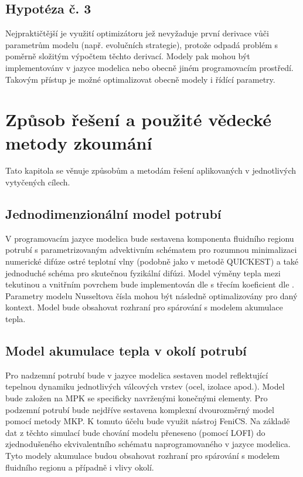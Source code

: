 \section*{Hypotéza č. 3}
Nejpraktičtější je využití optimizátoru jež nevyžaduje první derivace vůči
parametrům modelu (např. evolučních strategie), protože odpadá problém s
poměrně složitým výpočtem těchto derivací. Modely pak mohou být implementovánv
v jazyce modelica nebo obecně jiném programovacím prostředí. Takovým přístup je
možné optimalizovat obecně modely i řídící parametry.
\chapter{Způsob řešení a použité vědecké metody zkoumání}
Tato kapitola se věnuje způsobům a metodám řešení aplikovaných v jednotlivých
vytyčených cílech.
\section{Jednodimenzionální model potrubí}
\label{sec:1Dpipe}
V programovacím jazyce modelica bude sestavena komponenta fluidního regionu
potrubí s parametrizovaným advektivním schématem pro rozumnou minimalizaci
numerické difúze ostré teplotní vlny (podobně jako v metodě QUICKEST) a také
jednoduché schéma pro skutečnou fyzikální difúzi. Model výměny tepla mezi
tekutinou a vnitřním povrchem bude implementován dle \cite{Abraham2009} s
třecím koeficient dle \cite{Churchill1977}. Parametry modelu Nusseltova čísla
mohou být následně optimalizovány pro daný kontext. Model bude obsahovat
rozhraní pro spárování s modelem akumulace tepla.
\section{Model akumulace tepla v okolí potrubí}
\label{sec:PipeAcu}
Pro nadzemní potrubí bude v jazyce modelica sestaven model reflektující
tepelnou dynamiku jednotlivých válcových vrstev (ocel, izolace apod.). Model
bude založen na MPK se specificky navrženými konečnými elementy. Pro
podzemní potrubí bude nejdříve sestavena komplexní dvourozměrný model pomocí
metody MKP. K tomuto účelu bude využit nástroj FeniCS. Na základě dat z těchto
simulací bude chování modelu přeneseno (pomocí LOFI) do zjednodušeného
ekvivalentního schématu naprogramovaného v jazyce modelica. Tyto modely
akumulace budou obsahovat rozhraní pro spárování s modelem fluidního regionu a
případně i vlivy okolí.
